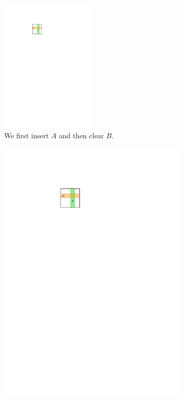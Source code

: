 \documentclass[english,gradu]{tktltiki2018}
\begin{document}
\begin{figure}\centering
	\begin{subfigure}[t]{0.4\textwidth}\centering
		\includegraphics[width=0.5\textwidth,page=1]{fig/uremove}
		\caption{We first insert $A$ and then clear $B$.}\label{fig:urm:rects}
	\end{subfigure}
	\hfil
	\begin{subfigure}[t]{0.4\textwidth}\centering
		\includegraphics[width=\textwidth,page=3]{fig/uremove}

\end{subfigure}
\end{figure}
\end{document}
